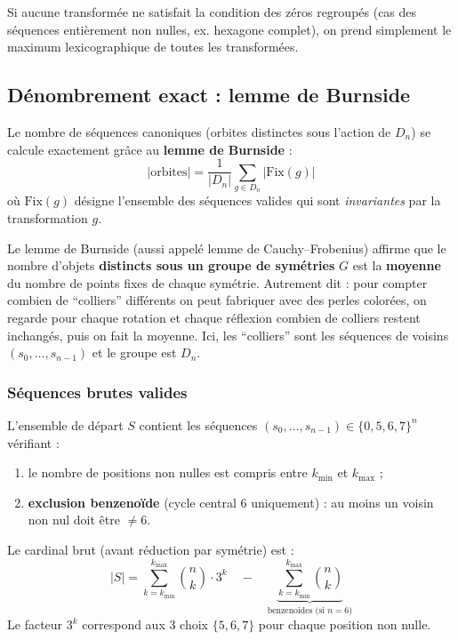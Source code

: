 \documentclass[a4paper,12pt]{article}
\begin{document}
Si aucune transformée ne satisfait la condition des zéros regroupés (cas des séquences
entièrement non nulles, ex. hexagone complet), on prend simplement le maximum lexicographique
de toutes les transformées.

\subsection{Dénombrement exact : lemme de Burnside}

Le nombre de séquences canoniques (orbites distinctes sous l'action de $D_n$) se calcule
exactement grâce au \textbf{lemme de Burnside} :
\[
  |\text{orbites}| = \frac{1}{|D_n|} \sum_{g \in D_n} |\text{Fix}(g)|
\]
où $\text{Fix}(g)$ désigne l'ensemble des séquences valides qui sont \textit{invariantes} par
la transformation $g$.

\begin{remarque}[title=Intuition du lemme de Burnside]
  Le lemme de Burnside (aussi appelé lemme de Cauchy--Frobenius) affirme que le nombre d'objets
  \textbf{distincts sous un groupe de symétries} $G$ est la \textbf{moyenne} du nombre de points
  fixes de chaque symétrie. Autrement dit : pour compter combien de ``colliers'' différents on
  peut fabriquer avec des perles colorées, on regarde pour chaque rotation et chaque réflexion
  combien de colliers restent inchangés, puis on fait la moyenne. Ici, les ``colliers'' sont les
  séquences de voisins $(s_0, \ldots, s_{n-1})$ et le groupe est $D_n$.
\end{remarque}

\subsubsection{Séquences brutes valides}

L'ensemble de départ $S$ contient les séquences $(s_0, \ldots, s_{n-1}) \in \{0,5,6,7\}^n$
vérifiant :
\begin{enumerate}
  \item le nombre de positions non nulles est compris entre $k_{\min}$ et $k_{\max}$ ;
  \item \textbf{exclusion benzenoïde} (cycle central 6 uniquement) : au moins un voisin
    non nul doit être $\neq 6$.
\end{enumerate}

Le cardinal brut (avant réduction par symétrie) est :
\[
  |S| = \sum_{k=k_{\min}}^{k_{\max}} \binom{n}{k} \cdot 3^k
  \quad - \quad \underbrace{\sum_{k=k_{\min}}^{k_{\max}} \binom{n}{k}}_{\text{benzenoïdes (si $n=6$)}}
\]
Le facteur $3^k$ correspond aux 3 choix $\{5, 6, 7\}$ pour chaque position non nulle.
\end{document}
